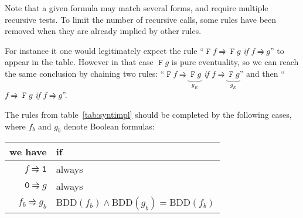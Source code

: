 \documentclass[a4paper,twoside,10pt,DIV=12]{scrreprt}
\DeclareMathOperator{\F}{\texttt{F}}
\newcommand{\0}{\texttt{0}}
\newcommand{\1}{\texttt{1}}
\def\simp{\rightrightharpoons}
\begin{document}
Note that a given formula may match several forms, and require
multiple recursive tests.  To limit the number of recursive calls,
some rules have been removed when they are already implied by other
rules.

For instance it one would legitimately expect the rule ``$\F f \simp
\F g$ \textit{if} $f\simp g$'' to appear in the table.  However in
that case $\F g$ is pure eventuality, so we can reach the same
conclusion by chaining two rules: ``$\F f \simp \underbrace{\F
  g}_{g_E}$ \textit{if} $f\simp \underbrace{\F g}_{g_E}$'' and then
``$f \simp \F g$ \textit{if} $f\simp g$''.

The rules from table~\ref{tab:syntimpl} should be completed by the
following cases, where $f_b$ and $g_b$ denote Boolean formulas:
\begin{center}
\begin{tabular}{rl}
we have                       & if                                    \\
\midrule
$f\simp \1$                   & always                                \\
$\0\simp g$                   & always                                \\
$f_b \simp g_b$               & $\mathrm{BDD}(f_b)\land \mathrm{BDD}(g_b) =
                                \mathrm{BDD}(f_b)$                    \\
\end{tabular}
\end{center}
\end{document}

